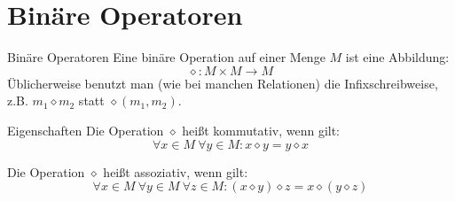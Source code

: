 \section{Binäre Operatoren}
\begin{frame}
	\begin{block}{Binäre Operatoren}
		Eine binäre Operation auf einer Menge $M$ ist eine Abbildung:
		\[ \diamond: M \times M \to M \]
		Üblicherweise benutzt man (wie bei manchen Relationen) die Infixschreibweise, z.B. $m_1 \diamond m_2$ statt  $\diamond(m_1,m_2)$.
	\end{block} \pause
	\begin{block}{Eigenschaften}
		Die Operation $\diamond$ heißt kommutativ, wenn gilt:
		\[ \forall x \in M \ \forall y \in M: x \diamond y = y \diamond x \]
		
		Die Operation $\diamond$ heißt assoziativ, wenn gilt:
		\[ \forall x \in M \ \forall y \in M \ \forall z \in M : (x \diamond y) \diamond z = x \diamond (y \diamond z) \]
	\end{block} \pause
\end{frame}